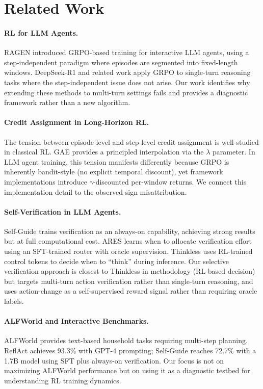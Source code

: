 \documentclass[11pt]{article}
\begin{document}
\section{Related Work}

\paragraph{RL for LLM Agents.}
RAGEN introduced GRPO-based training for interactive LLM agents, using a step-independent paradigm where episodes are segmented into fixed-length windows. DeepSeek-R1 and related work apply GRPO to single-turn reasoning tasks where the step-independent issue does not arise. Our work identifies why extending these methods to multi-turn settings fails and provides a diagnostic framework rather than a new algorithm.

\paragraph{Credit Assignment in Long-Horizon RL.}
The tension between episode-level and step-level credit assignment is well-studied in classical RL. GAE provides a principled interpolation via the $\lambda$ parameter. In LLM agent training, this tension manifests differently because GRPO is inherently bandit-style (no explicit temporal discount), yet framework implementations introduce $\gamma$-discounted per-window returns. We connect this implementation detail to the observed sign misattribution.

\paragraph{Self-Verification in LLM Agents.}
Self-Guide trains verification as an always-on capability, achieving strong results but at full computational cost. ARES learns when to allocate verification effort using an SFT-trained router with oracle supervision. Thinkless uses RL-trained control tokens to decide when to ``think'' during inference. Our selective verification approach is closest to Thinkless in methodology (RL-based decision) but targets multi-turn action verification rather than single-turn reasoning, and uses action-change as a self-supervised reward signal rather than requiring oracle labels.

\paragraph{ALFWorld and Interactive Benchmarks.}
ALFWorld provides text-based household tasks requiring multi-step planning. ReflAct achieves 93.3\% with GPT-4 prompting; Self-Guide reaches 72.7\% with a 1.7B model using SFT plus always-on verification. Our focus is not on maximizing ALFWorld performance but on using it as a diagnostic testbed for understanding RL training dynamics.
\end{document}
